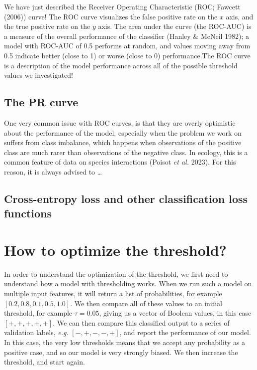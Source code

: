 \documentclass[
  letterpaper,
]{scrbook}
\begin{document}
We have just described the Receiver Operating Characteristic (ROC;
Fawcett (2006)) curve! The ROC curve visualizes the false positive rate
on the \(x\) axis, and the true positive rate on the \(y\) axis. The
area under the curve (the ROC-AUC) is a measure of the overall
performance of the classifier (Hanley \& McNeil 1982); a model with
ROC-AUC of 0.5 performs at random, and values moving away from 0.5
indicate better (close to 1) or worse (close to 0) performance.The ROC
curve is a description of the model performance across all of the
possible threshold values we investigated!

\subsection{The PR curve}\label{the-pr-curve}

One very common issue with ROC curves, is that they are overly
optimistic about the performance of the model, especially when the
problem we work on suffers from class imbalance, which happens when
observations of the positive class are much rarer than observations of
the negative class. In ecology, this is a common feature of data on
species interactions (Poisot \emph{et al.} 2023). For this reason, it is
always advised to \ldots{}

\subsection{Cross-entropy loss and other classification loss
functions}\label{cross-entropy-loss-and-other-classification-loss-functions}

\section{How to optimize the
threshold?}\label{how-to-optimize-the-threshold}

In order to understand the optimization of the threshold, we first need
to understand how a model with thresholding works. When we run such a
model on multiple input features, it will return a list of
probabilities, for example \([0.2, 0.8, 0.1, 0.5, 1.0]\). We then
compare all of these values to an initial threshold, for example
\(\tau = 0.05\), giving us a vector of Boolean values, in this case
\([+, +, +, +, +]\). We can then compare this classified output to a
series of validation labels, \emph{e.g.} \([-, +, -, -, +]\), and report
the performance of our model. In this case, the very low thresholds
means that we accept any probability as a positive case, and so our
model is very strongly biased. We then increase the threshold, and start
again.
\end{document}
